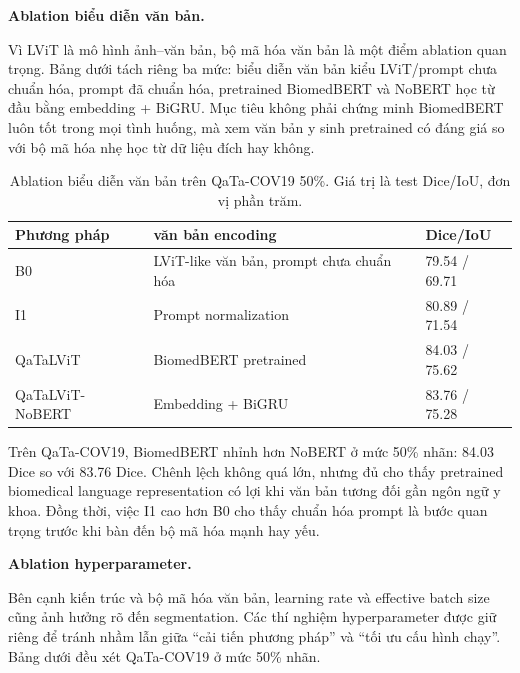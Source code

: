 \FloatBarrier

\textbf{Ablation biểu diễn văn bản.}

Vì LViT là mô hình ảnh--văn bản, bộ mã hóa văn bản là một điểm ablation quan trọng. Bảng dưới tách riêng ba mức: biểu diễn văn bản kiểu LViT/prompt chưa chuẩn hóa, prompt đã chuẩn hóa, pretrained BiomedBERT và NoBERT học từ đầu bằng embedding + BiGRU. Mục tiêu không phải chứng minh BiomedBERT luôn tốt trong mọi tình huống, mà xem văn bản y sinh pretrained có đáng giá so với bộ mã hóa nhẹ học từ dữ liệu đích hay không.

\begin{table}[H]
  \centering
  \caption{Ablation biểu diễn văn bản trên QaTa-COV19 50\%. Giá trị là test Dice/IoU, đơn vị phần trăm.}
  \label{tab:văn bản-bộ mã hóa-ablation}
  \scriptsize
  \renewcommand{\arraystretch}{1.12}
  \setlength{\tabcolsep}{4pt}
  \begin{tabularx}{\columnwidth}{@{}l L Y@{}}
    \toprule
    Phương pháp & văn bản encoding & Dice/IoU \\
    \midrule
    B0 & LViT-like văn bản, prompt chưa chuẩn hóa & 79.54 / 69.71 \\
    I1 & Prompt normalization & 80.89 / 71.54 \\
    QaTaLViT & BiomedBERT pretrained & 84.03 / 75.62 \\
    QaTaLViT-NoBERT & Embedding + BiGRU & 83.76 / 75.28 \\
    \bottomrule
  \end{tabularx}
\end{table}
\FloatBarrier

Trên QaTa-COV19, BiomedBERT nhỉnh hơn NoBERT ở mức 50\% nhãn: 84.03 Dice so với 83.76 Dice. Chênh lệch không quá lớn, nhưng đủ cho thấy pretrained biomedical language representation có lợi khi văn bản tương đối gần ngôn ngữ y khoa. Đồng thời, việc I1 cao hơn B0 cho thấy chuẩn hóa prompt là bước quan trọng trước khi bàn đến bộ mã hóa mạnh hay yếu.

\FloatBarrier

\textbf{Ablation hyperparameter.}

Bên cạnh kiến trúc và bộ mã hóa văn bản, learning rate và effective batch size cũng ảnh hưởng rõ đến segmentation. Các thí nghiệm hyperparameter được giữ riêng để tránh nhầm lẫn giữa ``cải tiến phương pháp'' và ``tối ưu cấu hình chạy''. Bảng dưới đều xét QaTa-COV19 ở mức 50\% nhãn.


